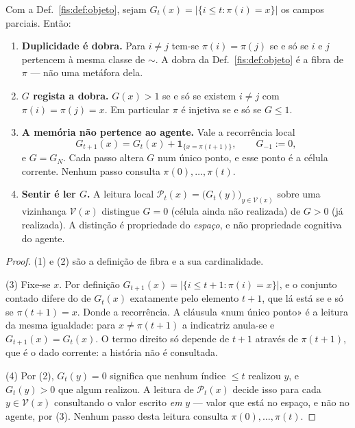 \documentclass[livro.tex]{subfiles}
\begin{document}
\begin{teorema}\label{fis:thm:mult}
Com a Def.~\ref{fis:def:objeto}, sejam $G_t(x)=\lvert\{i\le t:\pi(i)=x\}\rvert$
os campos parciais. Então:
\begin{enumerate}\itemsep3pt
\item[(1)] \textbf{Duplicidade é dobra.} Para $i\neq j$ tem-se $\pi(i)=\pi(j)$
se e só se $i$ e $j$ pertencem à mesma classe de $\sim$. A dobra da
Def.~\ref{fis:def:objeto} é a fibra de $\pi$ --- não uma metáfora dela.
\item[(2)] \textbf{$G$ regista a dobra.} $G(x)>1$ se e só se existem $i\neq j$
com $\pi(i)=\pi(j)=x$. Em particular $\pi$ é injetiva se e só se $G\le1$.
\item[(3)] \textbf{A memória não pertence ao agente.} Vale a recorrência local
\[
G_{t+1}(x)=G_t(x)+\mathbf{1}_{\{x=\pi(t+1)\}},\qquad G_{-1}:=0,
\]
e $G=G_N$. Cada passo altera $G$ num único ponto, e esse ponto é a célula
corrente. Nenhum passo consulta $\pi(0),\dots,\pi(t)$.
\item[(4)] \textbf{Sentir é ler $G$.} A leitura local
$\mathcal{P}_t(x)=\bigl(G_t(y)\bigr)_{y\in \mathcal{V}(x)}$ sobre uma vizinhança
$\mathcal{V}(x)$ distingue $G=0$ (célula ainda não realizada) de $G>0$ (já
realizada). A distinção é propriedade do \emph{espaço}, e não propriedade
cognitiva do agente.
\end{enumerate}
\end{teorema}

\begin{proof}
(1) e (2) são a definição de fibra e a sua cardinalidade.

(3) Fixe-se $x$. Por definição $G_{t+1}(x)=\lvert\{i\le t+1:\pi(i)=x\}\rvert$, e
o conjunto contado difere do de $G_t(x)$ exatamente pelo elemento $t+1$, que lá
está se e só se $\pi(t+1)=x$. Donde a recorrência. A cláusula «num único ponto» é
a leitura da mesma igualdade: para $x\neq\pi(t+1)$ a indicatriz anula-se e
$G_{t+1}(x)=G_t(x)$. O termo direito só depende de $t+1$ através de $\pi(t+1)$,
que é o dado corrente: a história não é consultada.

(4) Por (2), $G_t(y)=0$ significa que nenhum índice $\le t$ realizou $y$, e
$G_t(y)>0$ que algum realizou. A leitura de $\mathcal{P}_t(x)$ decide isso para
cada $y\in\mathcal{V}(x)$ consultando o valor escrito \emph{em} $y$ --- valor que
está no espaço, e não no agente, por (3). Nenhum passo desta leitura consulta
$\pi(0),\dots,\pi(t)$.
\end{proof}
\end{document}
